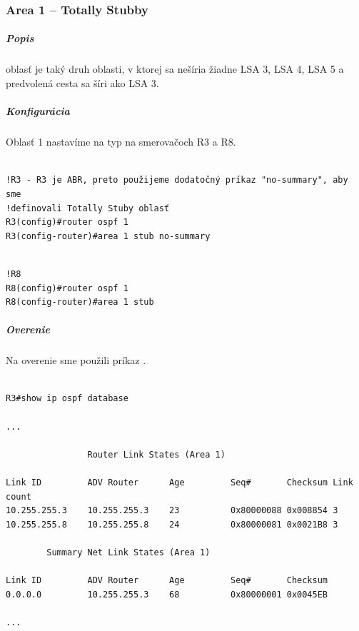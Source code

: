 \documentclass[12pt,twoside,a4paper]{article}
\begin{document}
\subsubsection*{Area 1 – Totally Stubby}
\subparagraph{Popis}
\subparagraph{}
 oblasť je taký druh oblasti, v ktorej sa nešíria žiadne LSA 3, LSA 4, LSA 5 a predvolená cesta sa šíri ako LSA 3.

\subparagraph{Konfigurácia}
\subparagraph{}
Oblasť 1 nastavíme na typ  na smerovačoch R3 a R8.

\noindent
{\selectfont
\begin{small}
\begin{verbatim}

!R3 - R3 je ABR, preto použijeme dodatočný príkaz "no-summary", aby sme 
!definovali Totally Stuby oblasť
R3(config)#router ospf 1
R3(config-router)#area 1 stub no-summary

\end{verbatim}
\end{small}
}

\noindent
{\selectfont
\begin{small}
\begin{verbatim}

!R8
R8(config)#router ospf 1
R8(config-router)#area 1 stub

\end{verbatim}
\end{small}
}

\subparagraph{Overenie}
\subparagraph{}
Na overenie sme použili príkaz . 

\noindent
{\selectfont
\begin{small}
\begin{verbatim}

R3#show ip ospf database

...

                Router Link States (Area 1)

Link ID         ADV Router      Age         Seq#       Checksum Link count
10.255.255.3    10.255.255.3    23          0x80000088 0x008854 3
10.255.255.8    10.255.255.8    24          0x80000081 0x0021B8 3

		Summary Net Link States (Area 1)

Link ID         ADV Router      Age         Seq#       Checksum
0.0.0.0         10.255.255.3    68          0x80000001 0x0045EB

...

\end{verbatim}
\end{small}
}
\end{document}

